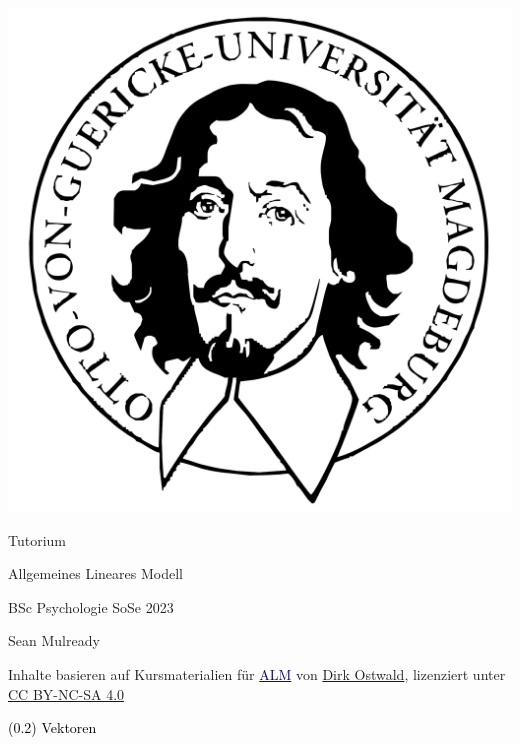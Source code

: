 \documentclass[
  8pt,
  ignorenonframetext,
]{beamer}
\author{}
\date{\vspace{-2.5em}}
\begin{document}
\begin{frame}[plain]{}
\protect\hypertarget{section}{}
\center

\begin{center}\includegraphics[width=0.2\linewidth]{../Abbildungen/wtfi_otto} \end{center}

\vspace{2mm}

\huge

Tutorium

\Large

Allgemeines Lineares Modell \vspace{4mm}

\normalsize

BSc Psychologie SoSe 2023

\vspace{12mm}
\normalsize

Sean Mulready

\vspace{3mm}
\scriptsize

Inhalte basieren auf Kursmaterialien für
\href{https://www.ipsy.ovgu.de/Institut/Abteilungen+des+Institutes/Methodenlehre+I+_+Experimentelle+und+Neurowissenschaftliche+Psychologie/Lehre/Sommersemester+2023/Allgemeines+Lineares+Modell.html}{\textcolor{darkblue}{ALM}}
von
\href{https://www.ipsy.ovgu.de/Institut/Abteilungen+des+Institutes/Methodenlehre+I+_+Experimentelle+und+Neurowissenschaftliche+Psychologie/Team/Dirk+Ostwald.html}{Dirk
Ostwald}, lizenziert unter
\href{https://creativecommons.org/licenses/by-sa/4.0/deed.de}{CC
BY-NC-SA 4.0}
\end{frame}

\begin{frame}[plain]{}
\protect\hypertarget{section-1}{}
\vfill
\center
\huge

\textcolor{black}{(0.2) Vektoren} \vfill
\end{frame}
\end{document}
